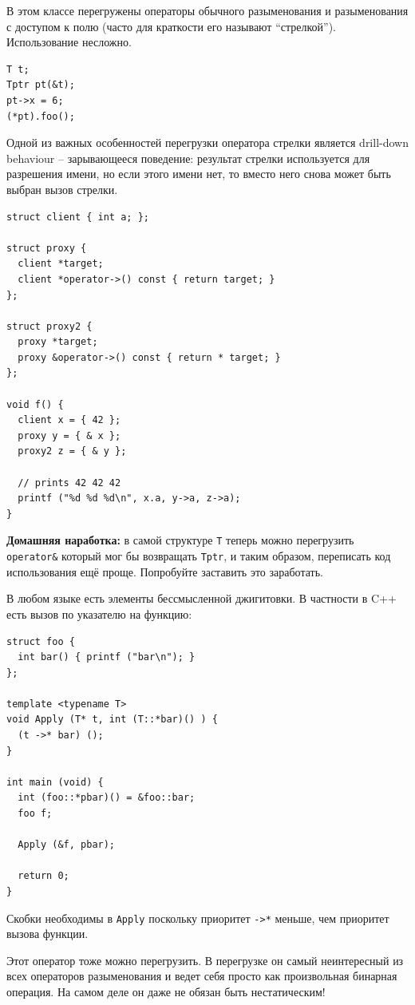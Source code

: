 \documentclass[a4paper,12pt,oneside]{article}
\begin{document}
В этом классе перегружены операторы обычного разыменования и разыменования с доступом к полю (часто для краткости его называют ``стрелкой''). Использование несложно.

\begin{lstlisting}
T t;
Tptr pt(&t);
pt->x = 6;
(*pt).foo();
\end{lstlisting}

Одной из важных особенностей перегрузки оператора стрелки является drill-down behaviour  -- зарывающееся поведение: результат стрелки используется для разрешения имени, но если этого имени нет, то вместо него снова может быть выбран вызов стрелки.

\begin{lstlisting}
struct client { int a; };

struct proxy {
  client *target;
  client *operator->() const { return target; }
};

struct proxy2 {
  proxy *target;
  proxy &operator->() const { return * target; }
};

void f() {
  client x = { 42 };
  proxy y = { & x };
  proxy2 z = { & y };

  // prints 42 42 42
  printf ("%d %d %d\n", x.a, y->a, z->a);    
}
\end{lstlisting}

\textbf{Домашняя наработка:} в самой структуре \lstinline!T! теперь можно перегрузить \lstinline!operator&! который мог бы возвращать \lstinline!Tptr!, и таким образом, переписать код использования ещё проще. Попробуйте заставить это заработать.

В любом языке есть элементы бессмысленной джигитовки. В частности в C++ есть вызов по указателю на функцию:

\begin{lstlisting}
struct foo {
  int bar() { printf ("bar\n"); }
};

template <typename T>
void Apply (T* t, int (T::*bar)() ) {
  (t ->* bar) ();
}

int main (void) {
  int (foo::*pbar)() = &foo::bar;
  foo f;

  Apply (&f, pbar);

  return 0;
}
\end{lstlisting}

Скобки необходимы в \lstinline!Apply! поскольку приоритет \lstinline!->*! меньше, чем приоритет вызова функции.

Этот оператор тоже можно перегрузить. В перегрузке он самый неинтересный из всех операторов разыменования и ведет себя просто как произвольная бинарная операция. На самом деле он даже не обязан быть нестатическим!
\end{document}
